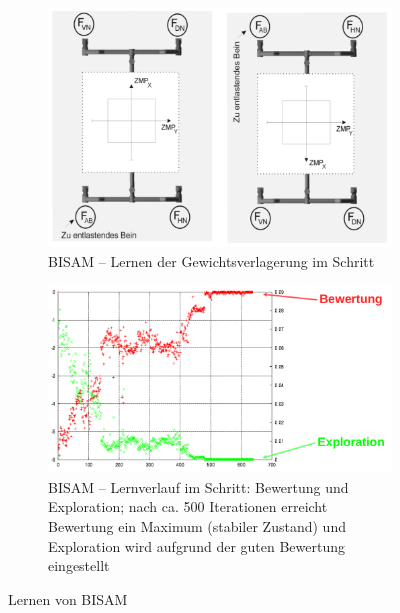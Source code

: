 \begin{figure}
	\centering
	\begin{subfigure}{.4\textwidth}
		\includegraphics[width=\textwidth]{figures/bisam_gewichtsverlagerung_schritt.png}
		\caption{BISAM -- Lernen der Gewichtsverlagerung im Schritt}
	\end{subfigure}
	\begin{subfigure}{.4\textwidth}
		\includegraphics[width=\textwidth]{figures/bisam_gewichtsverlagerung_schritt_1.png}
		\caption{BISAM -- Lernverlauf im Schritt: Bewertung und Exploration; nach ca. 500 Iterationen erreicht Bewertung ein Maximum (stabiler Zustand) und Exploration wird aufgrund der guten Bewertung eingestellt}
	\end{subfigure}
	\caption{Lernen von BISAM}
\end{figure}

